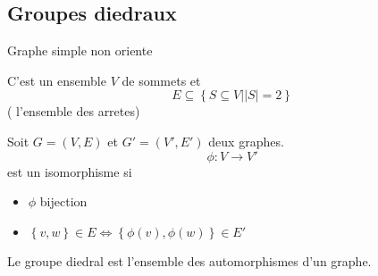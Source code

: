 \documentclass[../main.tex]{subfiles}
\begin{document}
\subsection{Groupes diedraux}
Graphe simple non oriente
\begin{defn}
	C'est un ensemble $V$ de sommets et
	\[ 
	E \subseteq \left\{ S \subseteq V \big\vert |S| = 2 \right\} 
	\]
	( l'ensemble des arretes) 

\end{defn}
\begin{defn}


	Soit $G= ( V,E) $ et $G'= ( V',E') $ deux graphes.\\
	 \[ 
	\phi: V \to V'
	\]
	est un isomorphisme si
	\begin{itemize}
	\item $\phi$ bijection
	\item $ \left\{ v,w \right\} \in E \iff \left\{ \phi( v) , \phi( w)  \right\} \in E'$
	\end{itemize}
\end{defn}
\begin{defn}
	Le groupe diedral est l'ensemble des automorphismes d'un graphe.

\end{defn}
\end{document}
